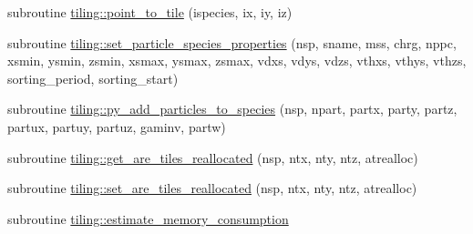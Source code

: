 \begin{DoxyCompactItemize}
\item 
subroutine \hyperlink{namespacetiling_a875e1671637fb100355fe099ef2a4f63}{tiling\+::point\+\_\+to\+\_\+tile} (ispecies, ix, iy, iz)
\item 
subroutine \hyperlink{namespacetiling_a832a380c64af7fb0611b3528b1b28ef2}{tiling\+::set\+\_\+particle\+\_\+species\+\_\+properties} (nsp, sname, mss, chrg, nppc, xsmin, ysmin, zsmin, xsmax, ysmax, zsmax, vdxs, vdys, vdzs, vthxs, vthys, vthzs, sorting\+\_\+period, sorting\+\_\+start)
\item 
subroutine \hyperlink{namespacetiling_a7d2954e264909ff996bff6096932a53d}{tiling\+::py\+\_\+add\+\_\+particles\+\_\+to\+\_\+species} (nsp, npart, partx, party, partz,                                                       partux, partuy, partuz, gaminv, partw)
\item 
subroutine \hyperlink{namespacetiling_a74f93e807809bce73965e51431a8f8c7}{tiling\+::get\+\_\+are\+\_\+tiles\+\_\+reallocated} (nsp, ntx, nty, ntz, atrealloc)
\item 
subroutine \hyperlink{namespacetiling_a9ac073551919a3ca368f58e56b9370e6}{tiling\+::set\+\_\+are\+\_\+tiles\+\_\+reallocated} (nsp, ntx, nty, ntz, atrealloc)
\item 
subroutine \hyperlink{namespacetiling_a535146a13d8c0743eba14d150ca49199}{tiling\+::estimate\+\_\+memory\+\_\+consumption}
\end{DoxyCompactItemize}
